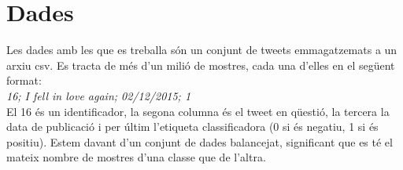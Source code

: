 \chapter{Dades}

Les dades amb les que es treballa són un conjunt de tweets emmagatzemats a un arxiu csv. Es tracta de més d’un milió de mostres, cada una d’elles en el següent format:\\

	\textit{16; I fell in love again; 02/12/2015; 1 }\\
    
El 16 és un identificador, la segona columna és el tweet en qüestió, la tercera la data de publicació i per últim l’etiqueta classificadora (0 si és negatiu, 1 si és positiu).
Estem davant d’un conjunt de dades balancejat, significant que es té el mateix nombre de mostres d’una classe que de l’altra.
